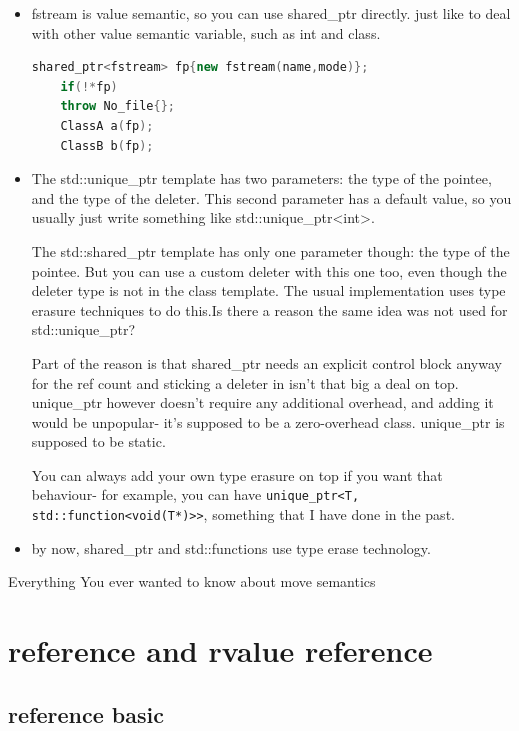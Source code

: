 \documentclass[a4paper,12pt,twoside]{book}
\begin{document}
\begin{itemize}
	\item fstream is value semantic, so you can use shared\_ptr directly. just like to deal with other value semantic variable, such as int and class.
	\begin{lstlisting}[frame=single, language=c++]
	shared_ptr<fstream> fp{new fstream(name,mode)};
	if(!*fp)
	throw No_file{};
	ClassA a(fp);
	ClassB b(fp);
	\end{lstlisting}
	
	\item The std::unique\_ptr template has two parameters: the type of the pointee, and the type of the deleter. This second parameter has a default value, so you usually just write something like std::unique\_ptr<int>.
	
	The std::shared\_ptr template has only one parameter though: the type of the pointee. But you can use a custom deleter with this one too, even though the deleter type is not in the class template. The usual implementation uses type erasure techniques to do this.Is there a reason the same idea was not used for std::unique\_ptr?
	
	Part of the reason is that shared\_ptr needs an explicit control block anyway for the ref count and sticking a deleter in isn't that big a deal on top. unique\_ptr however doesn't require any additional overhead, and adding it would be unpopular- it's supposed to be a zero-overhead class. unique\_ptr is supposed to be static.
	
	You can always add your own type erasure on top if you want that behaviour- for example, you can have \texttt{unique\_ptr<T, std::function<void(T*)>>}, something that I have done in the past.
	
	\item by now, shared\_ptr and std::functions use type erase technology. 
	
\end{itemize}


Everything You ever wanted to know about move semantics

\chapter{reference and rvalue reference}
\section{reference basic}
\end{document}
